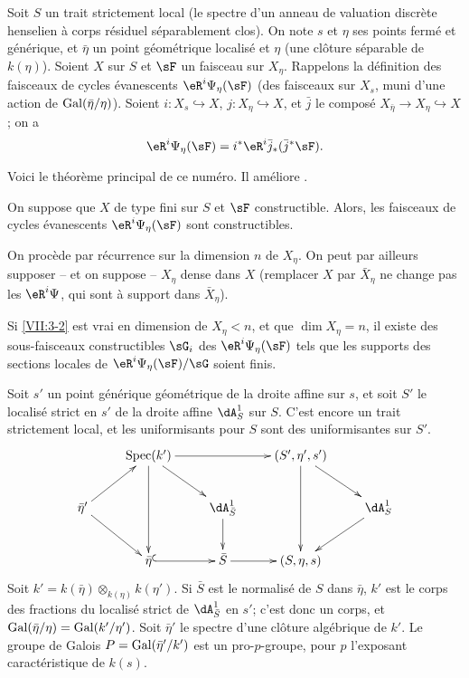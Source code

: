 Soit $S$ un trait strictement local (le spectre d'un anneau de valuation 
discr\`ete henselien \`a corps r\'esiduel s\'eparablement clos). On note $s$ et 
$\eta$ ses points ferm\'e et g\'en\'erique, et $\bar\eta$ un point 
g\'eom\'etrique localis\'e et $\eta$ (une cl\^oture s\'eparable de $k(\eta)$). 
Soient $X$ sur $S$ et $\sF$ un faisceau sur $X_\eta$. Rappelons la 
d\'efinition des faisceaux de cycles \'evanescents $\eR^i \Psi_\eta(\sF)$ (des 
faisceaux sur $X_s$, muni d'une action de $\operatorname{Gal}(\bar\eta/\eta)$). Soient 
$i:X_s\hookrightarrow X$, $j:X_\eta \hookrightarrow X$, et $\bar j$ le 
compos\'e $X_{\bar\eta}\to X_\eta \hookrightarrow X$; on a 
\[
  \eR^i \Psi_\eta(\sF) = i^\ast \eR^i \bar j_\ast (\bar j^\ast \sF) \text{.} 
\]

Voici le th\'eor\`eme principal de ce num\'ero. Il am\'eliore 
\cite[XIII 2.3.1, 2.4.2]{sga7}. 





\begin{theorem_}\label{VII:3-2}
On suppose que $X$ de type fini sur $S$ et $\sF$ constructible. Alors, les 
faisceaux de cycles \'evanescents $\eR^i \Psi_\eta(\sF)$ sont constructibles. 
\end{theorem_}

On proc\`ede par r\'ecurrence sur la dimension $n$ de $X_\eta$. On peut par 
ailleurs supposer -- et on suppose -- $X_\eta$ dense dans $X$ (remplacer $X$ 
par $\bar X_\eta$ ne change pas les $\eR^i \Psi$, qui sont \`a support dans 
$\bar X_\eta$). 





\begin{lemma_}\label{VII:3-3}
Si \ref{VII:3-2} est vrai en dimension de $X_\eta<n$, et que $\dim X_\eta=n$, 
il existe des sous-faisceaux constructibles $\sG_i$ des $\eR^i \Psi_\eta(\sF)$ 
tels que les supports des sections locales de $\eR^i\Psi_\eta(\sF)/\sG$ soient 
finis. 
\end{lemma_}

Soit $s'$ un point g\'en\'erique g\'eom\'etrique de la droite affine sur $s$, 
et soit $S'$ le localis\'e strict en $s'$ de la droite affine $\dA_S^1$ sur 
$S$. C'est encore un trait strictement local, et les uniformisants pour $S$ 
sont des uniformisantes sur $S'$. 
\[\xymatrix{
  & \spec(k') \ar[rr] \ar[dd] \ar[dr] 
    & & (S',\eta',s') \ar[dr] \ar[dd] \\
  \bar\eta' \ar[ur] \ar[dr] 
    & & \dA_{\bar S}^1 \ar[d]  
    & & \dA_S^1 \ar[dl] \\
  & \bar\eta\ar@{^{(}->}[r] 
    & \bar S \ar[r] 
    & (S,\eta,s) 
}\]
Soit $k'=k(\bar\eta)\otimes_{k(\eta)}k(\eta')$. Si $\bar S$ est le normalis\'e 
de $S$ dans $\bar\eta$, $k'$ est le corps des fractions du localis\'e strict 
de $\dA_{\bar S}^1$ en $s'$; c'est donc un corps, et 
$\operatorname{Gal}(\bar\eta/\eta)=\operatorname{Gal}(k'/\eta')$. Soit $\bar\eta'$ le spectre d'une 
cl\^oture alg\'ebrique de $k'$. Le groupe de Galois $P=\operatorname{Gal}(\bar\eta'/k')$ est 
un pro-$p$-groupe, pour $p$ l'exposant caract\'eristique de $k(s)$. 





